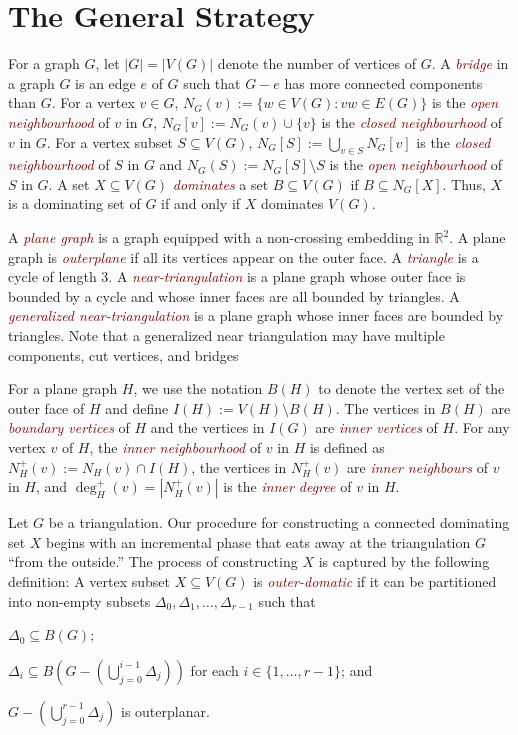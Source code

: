 \documentclass[12pt]{article}
\newcommand{\defin}[1]{\emph{\textcolor{Maroon}{#1}}}
\theoremstyle{definition}
\begin{document}
\section{The General Strategy}
\label{strategy}

For a graph $G$, let $|G|=|V(G)|$ denote the number of vertices of $G$.  A \defin{bridge} in a graph $G$ is an edge $e$ of $G$ such that $G-e$ has more connected components than $G$.  For a vertex $v\in G$, $N_G(v):=\{w\in V(G):vw\in E(G)\}$ is the \defin{open neighbourhood} of $v$ in $G$,  $N_G[v]:=N_G(v)\cup\{v\}$ is the \defin{closed neighbourhood} of $v$ in $G$.  For a vertex subset $S\subseteq V(G)$, $N_G[S]:=\bigcup_{v\in S} N_{G}[v]$ is the \defin{closed neighbourhood} of $S$ in $G$ and $N_G(S):=N_G[S]\setminus S$ is the \defin{open neighbourhood} of $S$ in $G$.  A set $X\subseteq V(G)$ \defin{dominates} a set $B\subseteq V(G)$ if $B\subseteq N_G[X]$.  Thus, $X$ is a dominating set of $G$ if and only if $X$ dominates $V(G)$.

A \defin{plane graph} is a graph equipped with a non-crossing embedding in $\mathbb{R}^2$.  A plane graph is \defin{outerplane} if all its vertices appear on the outer face.  A \defin{triangle} is a cycle of length $3$. A \defin{near-triangulation} is a plane graph whose outer face is bounded by a cycle and whose inner faces are all bounded by triangles.  A \defin{generalized near-triangulation} is a plane graph whose inner faces are bounded by triangles. Note that a generalized near triangulation may have multiple components, cut vertices, and bridges


For a plane graph $H$, we use the notation $B(H)$ to denote the vertex set of the outer face of $H$ and define $I(H):=V(H)\setminus B(H)$.  The vertices in $B(H)$ are \defin{boundary vertices} of $H$ and the vertices in $I(G)$ are \defin{inner vertices} of $H$. For any vertex $v$ of $H$, the \defin{inner neighbourhood} of $v$ in $H$ is defined as $N_H^+(v):=N_H(v)\cap I(H)$, the vertices in $N^+_H(v)$ are \defin{inner neighbours} of $v$ in $H$, and $\deg^+_H(v)=|N^+_H(v)|$ is the \defin{inner degree} of $v$ in $H$.

Let $G$ be a triangulation.  Our procedure for constructing a connected dominating set $X$ begins with an incremental phase that eats away at the triangulation $G$ ``from the outside.'' The process of constructing $X$ is captured by the following definition:   A vertex subset $X\subseteq V(G)$ is \defin{outer-domatic} if it can be partitioned into non-empty subsets $\Delta_0,\Delta_1,\ldots,\Delta_{r-1}$ such that
\begin{compactenum}[(P1)]
    \item $\Delta_0\subseteq B(G)$; \label{outer_face}
    \item $\Delta_i\subseteq B(G-(\bigcup_{j=0}^{i-1}\Delta_j))$ for each $i\in\{1,\ldots,r-1\}$; and \label{incremental}
    \item $G-(\bigcup_{j=0}^{r-1}\Delta_j)$ is outerplanar. \label{outerplanar}
\end{compactenum}
\end{document}
